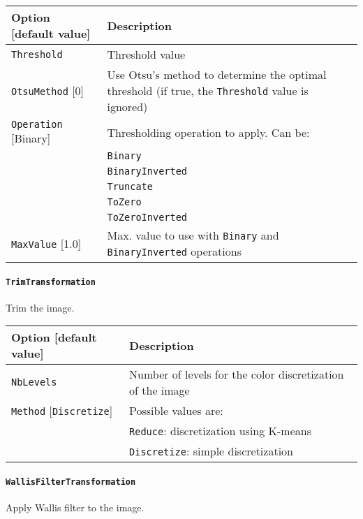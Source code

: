 \documentclass[a4paper,11pt,oneside]{article}
\newcommand{\iponly}{\reversemarginpar
    \marginnote{\color{listletiblue}\normalfont\scriptsize
    {\ttfamily{}\hyperref[sec:N2D2-IP]{\color{listletiblue}N2D2 IP}} \emph{only}}}
\begin{document}
\begin{center}
 \begin{tabular}{| p{5cm} | p{10cm} | }
 \hline
 Option [default value] & Description\\
 \hline\hline
  \cellcolor{requiredcolor}\lstinline!Threshold! & Threshold value \\
  \lstinline!OtsuMethod! [0] & Use Otsu's method to determine the optimal
  threshold (if true, the \lstinline!Threshold! value is ignored) \\
  \lstinline!Operation! [Binary] & Thresholding operation to apply. Can be:\\
   & \lstinline!Binary! \\
   & \lstinline!BinaryInverted! \\
   & \lstinline!Truncate! \\
   & \lstinline!ToZero! \\
   & \lstinline!ToZeroInverted! \\
  \lstinline!MaxValue! [1.0] & Max. value to use with \lstinline!Binary! and \lstinline!BinaryInverted! operations \\
 \hline
\end{tabular}
\end{center}


\paragraph{\texorpdfstring{%
\lstinline[basicstyle=\ttfamily\bfseries]!TrimTransformation!}
{TrimTransformation}}
Trim the image.

\begin{center}
 \begin{tabular}{| p{5cm} | p{10cm} | }
 \hline
 Option [default value] & Description\\
 \hline\hline
  \cellcolor{requiredcolor}\lstinline!NbLevels! & Number of levels for the color discretization of the image \\
  \lstinline!Method! [\lstinline!Discretize!] & Possible values are: \\
   & \lstinline!Reduce!: discretization using K-means \\
   & \lstinline!Discretize!: simple discretization \\
 \hline
\end{tabular}
\end{center}


\paragraph{\texorpdfstring{%
\lstinline[basicstyle=\ttfamily\bfseries]!WallisFilterTransformation!%
\protect\iponly}{WallisFilterTransformation}}
Apply Wallis filter to the image.
\end{document}
